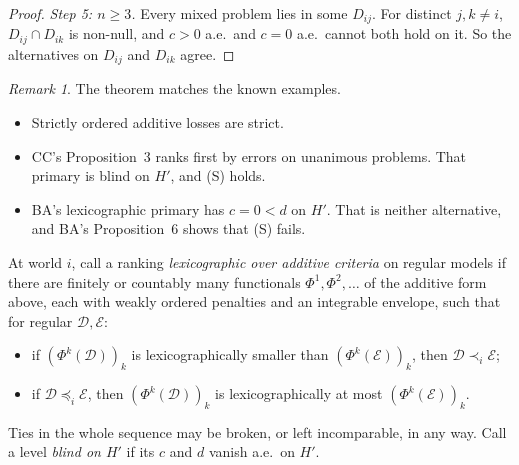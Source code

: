\documentclass[11pt]{article}
\theoremstyle{remark}\newtheorem{remark}[theorem]{Remark}
\newcommand{\Dscr}{\mathcal D}
\newcommand{\Escr}{\mathcal E}
\begin{document}
\begin{proof}
\emph{Step 5: $n\ge3$.} Every mixed problem lies in some $D_{ij}$. For
distinct $j,k\ne i$, $D_{ij}\cap D_{ik}$ is non-null, and $c>0$ a.e.\ and
$c=0$ a.e.\ cannot both hold on it. So the alternatives on $D_{ij}$ and $D_{ik}$
agree.
\end{proof}

\begin{remark}
The theorem matches the known examples.
\begin{itemize}[leftmargin=*,itemsep=1pt]
\item Strictly ordered additive losses are strict.
\item CC's Proposition~3 ranks first by errors on unanimous problems. That
primary is blind on $H'$, and (S) holds.
\item BA's lexicographic primary has $c=0<d$ on $H'$. That is neither
alternative, and BA's Proposition~6 shows that (S) fails.
\end{itemize}
\end{remark}

At world $i$, call a ranking \emph{lexicographic over additive criteria} on
regular models if there are finitely or countably many functionals
$\Phi^1,\Phi^2,\ldots$ of the additive form above, each with weakly ordered
penalties and an integrable envelope, such that for regular $\Dscr,\Escr$:
\begin{itemize}[leftmargin=*,itemsep=1pt]
\item if $(\Phi^k(\Dscr))_k$ is lexicographically smaller than
$(\Phi^k(\Escr))_k$, then $\Dscr\prec_i\Escr$;
\item if $\Dscr\preceq_i\Escr$, then $(\Phi^k(\Dscr))_k$ is lexicographically
at most $(\Phi^k(\Escr))_k$.
\end{itemize}
Ties in the whole sequence may be broken, or left incomparable, in any way.
Call a level \emph{blind on $H'$} if its $c$ and $d$ vanish a.e.\ on $H'$.
\end{document}
